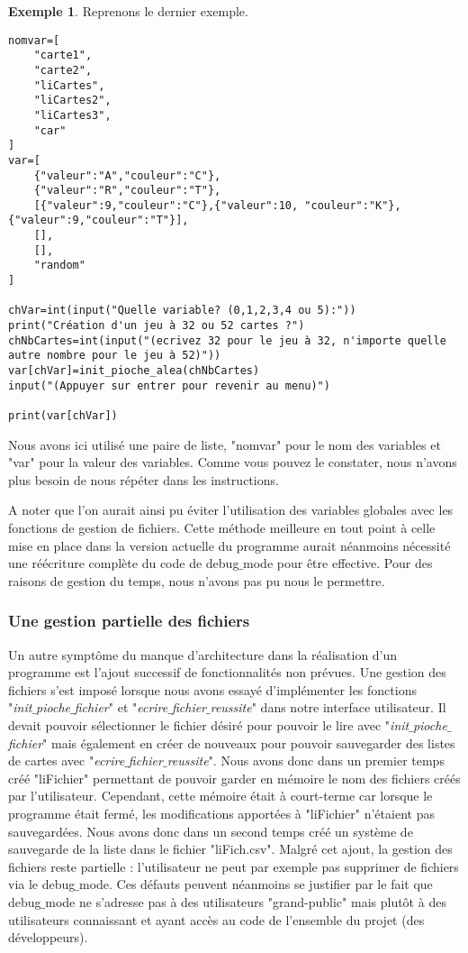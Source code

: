 \documentclass[10pt,a4paper,french,titlepage]{article}
\theoremstyle{definition}
\newtheorem{exmp}{Exemple}
\begin{document}
\begin{exmp}
Reprenons le dernier exemple.
\begin{lstlisting}
nomvar=[
    "carte1",
    "carte2",
    "liCartes",
    "liCartes2",
    "liCartes3",
    "car"
]
var=[
    {"valeur":"A","couleur":"C"},
    {"valeur":"R","couleur":"T"},
    [{"valeur":9,"couleur":"C"},{"valeur":10, "couleur":"K"},{"valeur":9,"couleur":"T"}],
    [],
    [],
    "random"
]

chVar=int(input("Quelle variable? (0,1,2,3,4 ou 5):"))
print("Création d'un jeu à 32 ou 52 cartes ?")
chNbCartes=int(input("(ecrivez 32 pour le jeu à 32, n'importe quelle autre nombre pour le jeu à 52)"))
var[chVar]=init_pioche_alea(chNbCartes)
input("(Appuyer sur entrer pour revenir au menu)")

print(var[chVar])
\end{lstlisting}
Nous avons ici utilisé une paire de liste, "nomvar" pour le nom des variables et "var" pour la valeur des variables. Comme vous pouvez le constater, nous n'avons plus besoin de nous répéter dans les instructions.
\end{exmp}
A noter que l'on aurait ainsi pu éviter l'utilisation des variables globales avec les fonctions de gestion de fichiers. Cette méthode meilleure en tout point à celle mise en place dans la version actuelle du programme aurait néanmoins nécessité une réécriture complète du code de debug$\_$mode pour être effective. Pour des raisons de gestion du temps, nous n'avons pas pu nous le permettre.
\subsubsection{Une gestion partielle des fichiers}
Un autre symptôme du manque d'architecture dans la réalisation d'un programme est l'ajout successif de fonctionnalités non prévues. Une gestion des fichiers s'est imposé lorsque nous avons essayé d'implémenter les fonctions \\"\textit{init$\_$pioche$\_$fichier}" et "\textit{ecrire$\_$fichier$\_$reussite}" dans notre interface utilisateur. Il devait pouvoir sélectionner le fichier désiré pour pouvoir le lire avec "\textit{init$\_$pioche$\_$fichier}" mais également en créer de nouveaux pour pouvoir sauvegarder des listes de cartes avec "\textit{ecrire$\_$fichier$\_$reussite}". Nous avons donc dans un premier temps créé "liFichier" permettant de pouvoir garder en mémoire le nom des fichiers créés par l'utilisateur. Cependant, cette mémoire était à court-terme car lorsque le programme était fermé, les modifications apportées à "liFichier" n'étaient pas sauvegardées. Nous avons donc dans un second temps créé un système de sauvegarde de la liste dans le fichier "liFich.csv". Malgré cet ajout, la gestion des fichiers reste partielle : l'utilisateur ne peut par exemple pas supprimer de fichiers via le debug$\_$mode. Ces défauts peuvent néanmoins se justifier par le fait que debug$\_$mode ne s'adresse pas à des utilisateurs "grand-public" mais plutôt à des utilisateurs connaissant et ayant accès au code de l'ensemble du projet (des développeurs).
\end{document}
